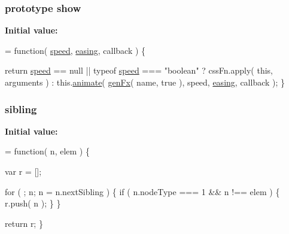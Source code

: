 \hypertarget{jquery-1_810_82-vsdoc_8js_a8dcdb81268297f0ecf76be5e6aebd05c}{
\subsubsection[{show}]{ {\bf prototype} show}}\label{jquery-1_810_82-vsdoc_8js_a8dcdb81268297f0ecf76be5e6aebd05c}
{\bfseries Initial value\-:}
\begin{DoxyCode}
= \textcolor{keyword}{function}( \hyperlink{jquery-1_810_82-vsdoc_8js_add98c90065e6563cba26ff6d2016c46c}{speed}, \hyperlink{jquery-1_810_82-vsdoc_8js_a9758a312629fa6de1744280dd6e6253b}{easing}, callback ) \{


        \textcolor{keywordflow}{return} \hyperlink{jquery-1_810_82-vsdoc_8js_add98c90065e6563cba26ff6d2016c46c}{speed} == null || typeof \hyperlink{jquery-1_810_82-vsdoc_8js_add98c90065e6563cba26ff6d2016c46c}{speed} === \textcolor{stringliteral}{"boolean"} ?
            cssFn.apply( \textcolor{keyword}{this}, arguments ) :
            this.\hyperlink{jquery-1_810_82-vsdoc_8js_a956a1d08128d41115c45b6815814a64d}{animate}( \hyperlink{jquery-1_810_82_8js_a0dad9ae6c57fd32a071de202faa87081}{genFx}( name, \textcolor{keyword}{true} ), speed, \hyperlink{jquery-1_810_82-vsdoc_8js_a9758a312629fa6de1744280dd6e6253b}{easing}, callback );
    \}
\end{DoxyCode}
\hypertarget{jquery-1_810_82-vsdoc_8js_aab3156d09bb394a1adc703b3daa9a6e5}{
\subsubsection[{sibling}]{ sibling}}\label{jquery-1_810_82-vsdoc_8js_aab3156d09bb394a1adc703b3daa9a6e5}
{\bfseries Initial value\-:}
\begin{DoxyCode}
= \textcolor{keyword}{function}( n, elem ) \{

        var r = [];

        \textcolor{keywordflow}{for} ( ; n; n = n.nextSibling ) \{
            \textcolor{keywordflow}{if} ( n.nodeType === 1 && n !== elem ) \{
                r.push( n );
            \}
        \}

        \textcolor{keywordflow}{return} r;
    \}
\end{DoxyCode}
